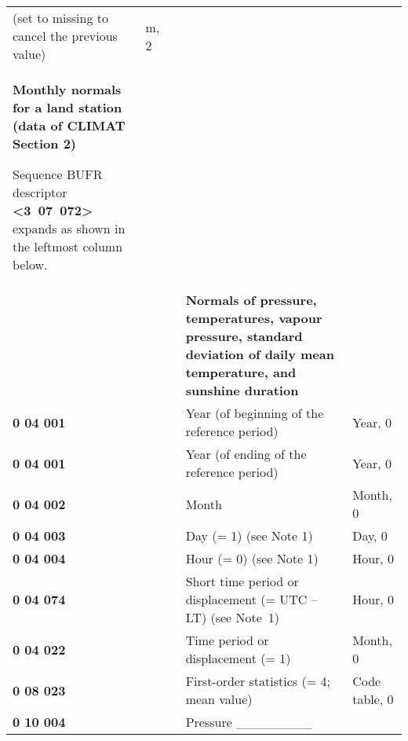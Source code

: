 \begin{longtable}[]{@{}lllll@{}}
\begin{minipage}[t]{0.17\columnwidth}
(set to missing to cancel the previous value)\strut
\end{minipage} & \begin{minipage}[t]{0.17\columnwidth}\raggedright
m, 2\strut
\end{minipage}\tabularnewline
\begin{minipage}[t]{0.17\columnwidth}\raggedright
\textbf{Monthly normals for a land station (data of CLIMAT Section 2)}

Sequence BUFR descriptor \textbf{\textless3~07~072\textgreater{}} expands as shown in the leftmost column below.\strut
\end{minipage} & \begin{minipage}[t]{0.17\columnwidth}\raggedright
\strut
\end{minipage} & \begin{minipage}[t]{0.17\columnwidth}\raggedright
\strut
\end{minipage} & \begin{minipage}[t]{0.17\columnwidth}\raggedright
\strut
\end{minipage} & \begin{minipage}[t]{0.17\columnwidth}\raggedright
\strut
\end{minipage}\tabularnewline
& & & \textbf{Normals of pressure, temperatures, vapour pressure, standard deviation of daily mean temperature, and sunshine duration} &\tabularnewline
\textbf{0 04 001} & & & Year (of beginning of the reference period) & Year, 0\tabularnewline
\textbf{0 04 001} & & & Year (of ending of the reference period) & Year, 0\tabularnewline
\textbf{0 04 002} & & & Month & Month, 0\tabularnewline
\textbf{0 04 003} & & & Day (= 1) (see Note 1) & Day, 0\tabularnewline
\textbf{0 04 004} & & & Hour (= 0) (see Note 1) & Hour, 0\tabularnewline
\textbf{0 04 074} & & & Short time period or displacement (= UTC -- LT) (see Note~1) & Hour, 0\tabularnewline
\textbf{0 04 022} & & & Time period or displacement (= 1) & Month, 0\tabularnewline
\textbf{0 08 023} & & & First-order statistics (= 4; mean value) & Code table, 0\tabularnewline
\begin{minipage}[t]{0.17\columnwidth}\raggedright
\textbf{0 10 004}\strut
\end{minipage} & \begin{minipage}[t]{0.17\columnwidth}\raggedright
\strut
\end{minipage} & \begin{minipage}[t]{0.17\columnwidth}\raggedright
\strut
\end{minipage} & \begin{minipage}[t]{0.17\columnwidth}\raggedright
Pressure \_\_\_\_\_\_\_\_


\end{minipage}
\end{longtable}
